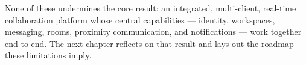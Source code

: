 None of these undermines the core result: an integrated, multi-client, real-time
collaboration platform whose central capabilities --- identity, workspaces,
messaging, rooms, proximity communication, and notifications --- work together
end-to-end. The next chapter reflects on that result and lays out the roadmap
these limitations imply.
